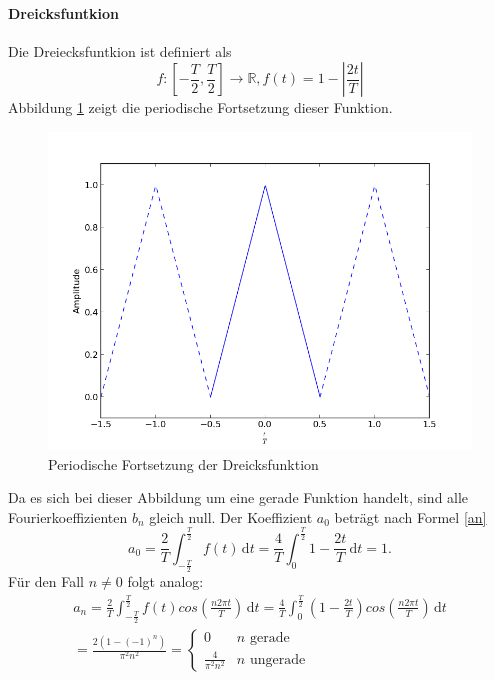 \documentclass[11pt,ngerman,a4paper]{article}
\begin{document}
\paragraph{Dreicksfuntkion}
Die Dreiecksfuntkion ist definiert als
\begin{equation}
f \colon  \left[-\frac{T}{2}, \frac{T}{2}\right]\to \mathbb{R}, f(t) = 1 - \left|\frac{2t}{T}\right|
\end{equation}
Abbildung \ref{org_hut} zeigt die periodische Fortsetzung dieser Funktion.
\begin{figure}[htp]
\centering
\includegraphics[scale=0.7]{abb/Abb2.png}
\caption{Periodische Fortsetzung der Dreicksfunktion}
\label{org_hut}
\end{figure} Da es sich bei dieser Abbildung um eine gerade Funktion handelt, sind alle Fourierkoeffizienten $b_n$ gleich null. Der Koeffizient $a_0$ betr\"agt nach Formel \ref{an}
\begin{equation} 
a_0 =\frac{2}{T} \int_{-\frac{T}{2}}^{\frac{T}2}\!f(t)\,\mathrm dt= \frac4T \int_{0}^{\frac{T}2}\!1-\frac{2t}{T}\,\mathrm dt= 1.
\end{equation}
F\"ur den Fall $n \neq 0$ folgt analog:
\begin{align}
a_n =\frac{2}{T} \int_{-\frac{T}{2}}^{\frac{T}2}\!f(t)cos\left(\frac{n2\pi t}{T}\right) \,\mathrm dt = \frac{4}{T} \int_0^\frac{T}2\!\left(1-\frac{2t}{T}\right)cos\left(\frac{n2\pi t}{T}\right)\,\mathrm dt \\= \frac{2 (1-(-1)^n)}{\pi^2n^2} = \begin{cases}
0 & n\mbox{ gerade} \\ \frac{4}{\pi^2n^2} & n\mbox{ ungerade}
\end{cases}
\end{align} 
\end{document}
